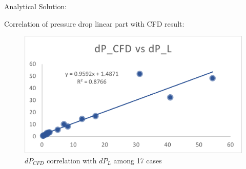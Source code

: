 \documentclass{beamer}
\begin{document}
\begin{frame}
\begin{columns}
        \hspace{0.03\textwidth}

        \begin{column}{0.6\textwidth}

            Analytical Solution:


            \vspace{0.02\textwidth}




            \vspace{0.02\textwidth}

            
            Correlation of pressure drop linear part 
            with CFD result:
            
            \begin{figure}[H]
                \centering
                \includegraphics[width=\textwidth]{figures/Result_T.jpg}
                \caption{$dP_{CFD}$ correlation with $dP_L$ among 17 cases}
            \end{figure}

            \vspace{-0.1\textwidth}


\end{column}
\end{columns}
\end{frame}
\end{document}
